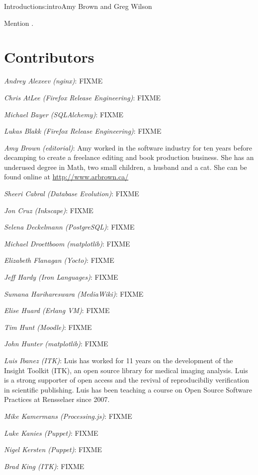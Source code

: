 \begin{aosachapter}{Introduction}{s:intro}{Amy Brown and Greg Wilson}

Mention \cite{bib:aosa1}.

\section*{Contributors}

\emph{Andrey Alexeev (nginx)}: FIXME

\emph{Chris AtLee (Firefox Release Engineering)}: FIXME

\emph{Michael Bayer (SQLAlchemy)}: FIXME

\emph{Lukas Blakk (Firefox Release Engineering)}: FIXME

\emph{Amy Brown (editorial)}: Amy worked in the software industry for
ten years before decamping to create a freelance editing and book production
business. She has an underused degree in Math, two small children, a
husband and a cat. She can be found online at \url{http://www.arbrown.ca/}

\emph{Sheeri Cabral (Database Evolution)}: FIXME

\emph{Jon Cruz (Inkscape)}: FIXME

\emph{Selena Deckelmann (PostgreSQL)}: FIXME

\emph{Michael Droettboom (matplotlib)}: FIXME

\emph{Elizabeth Flanagan (Yocto)}: FIXME

\emph{Jeff Hardy (Iron Languages)}: FIXME

\emph{Sumana Harihareswara (MediaWiki)}: FIXME

\emph{Elise Huard (Erlang VM)}: FIXME

\emph{Tim Hunt (Moodle)}: FIXME

\emph{John Hunter (matplotlib)}: FIXME

\emph{Luis Ibanez (ITK)}: Luis has worked for 11 years on the development of
the Insight Toolkit (ITK), an open source library for medical imaging analysis.
Luis is a strong supporter of open access and the revival of reproducibiliy
verification in scientific publishing. Luis has been teaching a course on Open
Source Software Practices at Rensselaer since 2007.

\emph{Mike Kamermans (Processing.js)}: FIXME

\emph{Luke Kanies (Puppet)}: FIXME

\emph{Nigel Kersten (Puppet)}: FIXME

\emph{Brad King (ITK)}: FIXME


\end{aosachapter}
